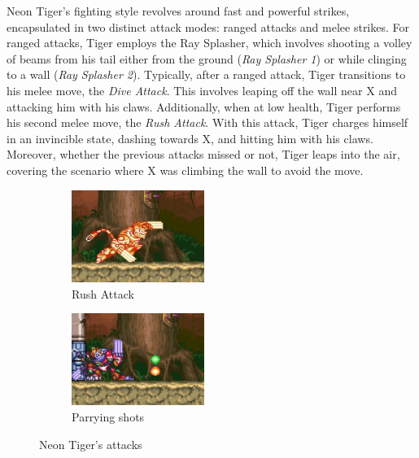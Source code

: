 Neon Tiger's fighting style revolves around fast and powerful strikes, encapsulated in two distinct attack modes: ranged attacks and melee strikes. For ranged attacks, Tiger employs the Ray Splasher, which involves shooting a volley of beams from his tail either from the ground (\emph{Ray Splasher 1}) or while clinging to a wall (\emph{Ray Splasher 2}). Typically, after a ranged attack, Tiger transitions to his melee move, the \emph{Dive Attack}. This involves leaping off the wall near X and attacking him with his claws. Additionally, when at low health, Tiger performs his second melee move, the \emph{Rush Attack}. With this attack, Tiger charges himself in an invincible state, dashing towards X, and hitting him with his claws. Moreover, whether the previous attacks missed or not, Tiger leaps into the air, covering the scenario where X was climbing the wall to avoid the move.
\begin{figure}[htp]
	\ContinuedFloat
	\centering
	\begin{subfigure}{.4\linewidth}
		\centering
		\includegraphics[height=3cm]{figures/X3/Neon_tiger/tiger_dm.jpg}
		\caption{Rush Attack}
	\end{subfigure}
	\begin{subfigure}{.4\linewidth}
		\centering
		\includegraphics[height=3cm]{figures/X3/Neon_tiger/tiger_guard.jpg}
		\caption{Parrying shots}
	\end{subfigure}
	\caption{Neon Tiger's attacks}
\end{figure}

